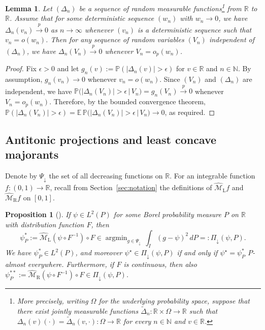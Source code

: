 \documentclass[a4paper]{article}
\newcommand{\N}{\mathbb{N}}
\newcommand{\R}{\mathbb{R}}
\newcommand{\E}{\mathbb{E}}
\renewcommand{\Pr}{\mathbb{P}}
\newcommand{\cvp}{\overset{p}{\to}}
\DeclareMathOperator*{\argmin}{argmin}
\newtheorem{lemma}[theorem]{Lemma}
\newtheorem{proposition}[theorem]{Proposition}
\theoremstyle{definition}
\begin{document}
\begin{lemma}
\label{lem:cvp-plugin}
Let $(\Delta_n)$ be a sequence of random measurable functions\footnote{More precisely, writing $\Omega$ for the underlying probability space, suppose that there exist jointly measurable functions $\tilde{\Delta}_n \colon \R \times \Omega \to \R$ such that $\Delta_n(v)(\cdot) = \tilde{\Delta}_n(v,\cdot) \colon \Omega \to \R$ for every $n \in \N$ and $v \in \R$.} from $\R$ to $\R$. Assume that for some deterministic sequence $(w_n)$ with $w_n \to 0$, we have $\Delta_n(v_n) \cvp 0$ as $n \to \infty$ whenever $(v_n)$ is a deterministic sequence such that $v_n = o(w_n)$. Then for any sequence of random variables $(V_n)$ independent of~$(\Delta_n)$, we have $\Delta_n(V_n) \cvp 0$ whenever $V_n = o_p(w_n)$.
\end{lemma}

\begin{proof}
Fix $\epsilon > 0$ and let $g_n(v) := \Pr(|\Delta_n(v)| > \epsilon)$ for $v \in \R$ and $n \in \N$. By assumption, $g_n(v_n) \to 0$ whenever $v_n = o(w_n)$. Since $(V_n)$ and $(\Delta_n)$ are independent, we have $\Pr\bigl(|\Delta_n(V_n)| > \epsilon\,|\,V_n\bigr) = g_n(V_n) \cvp 0$ whenever $V_n = o_p(w_n)$. 
Therefore, by the bounded convergence theorem, $\Pr(|\Delta_n(V_n)| > \epsilon) = \E\,\Pr\bigl(|\Delta_n(V_n)| > \epsilon\,|\,V_n\bigr) \to 0$, as required.
\end{proof}

\subsection{Antitonic projections and least concave majorants}
\label{sec:isoproj}

Denote by $\Psi_\downarrow$ the set of all decreasing functions on $\R$. For an integrable function $f \colon (0,1) \to \R$, recall from Section~\ref{sec:notation} the definitions of $\widehat{\mathcal{M}}_\mathrm{L}f$ and $\widehat{\mathcal{M}}_\mathrm{R}f$ on $[0,1]$.

\begin{proposition}[]
\label{prop:isoproj}
If $\psi \in L^2(P)$ for some Borel probability measure $P$ on $\R$ with distribution function $F$, then
\begin{equation}
\label{eq:isoproj}
\psi_P^* := \widehat{\mathcal{M}}_\mathrm{L}(\psi \circ F^{-1}) \circ F \in \argmin_{g \in \Psi_\downarrow}\,\int_I (g - \psi)^2\,dP =: \Pi_\downarrow(\psi, P).
\end{equation}
We have $\psi_P^* \in L^2(P)$, and moreover $\psi^\star \in \Pi_\downarrow(\psi, P)$ if and only if $\psi^\star = \psi_P^*$ $P$-almost everywhere. Furthermore, if $F$ is continuous, then also $\psi_P^{**} := \widehat{\mathcal{M}}_\mathrm{R}(\psi \circ F^{-1}) \circ F \in \Pi_\downarrow(\psi, P)$.
\end{proposition}
\end{document}
